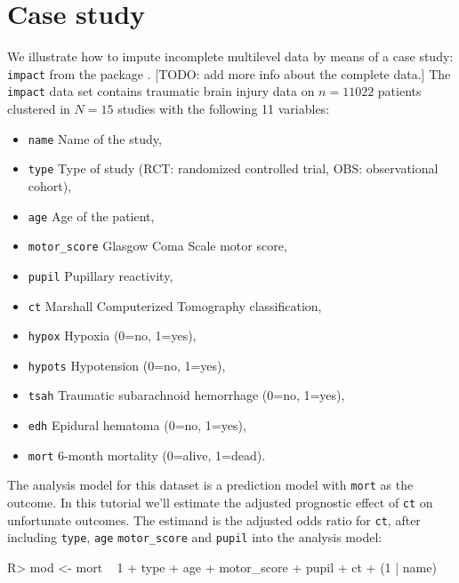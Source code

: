 \documentclass[
]{jss}
\providecommand{\tightlist}{%
  \setlength{\itemsep}{0pt}\setlength{\parskip}{0pt}}
\begin{document}
\hypertarget{case-study}{%
\section{Case study}\label{case-study}}

We illustrate how to impute incomplete multilevel data by means of a
case study: \texttt{impact} from the  package
\citep[empirical data on traumatic brain injuries, \(n = 11,022\) units
across \(N = 15\) clusters,][]{metamisc}. {[}TODO: add more info about
the complete data.{]} The \texttt{impact} data set contains traumatic
brain injury data on \(n = 11022\) patients clustered in \(N = 15\)
studies with the following 11 variables:

\begin{itemize}
\tightlist
\item
  \texttt{name} Name of the study,
\item
  \texttt{type} Type of study (RCT: randomized controlled trial, OBS:
  observational cohort),
\item
  \texttt{age} Age of the patient,
\item
  \texttt{motor\_score} Glasgow Coma Scale motor score,
\item
  \texttt{pupil} Pupillary reactivity,
\item
  \texttt{ct} Marshall Computerized Tomography classification,
\item
  \texttt{hypox} Hypoxia (0=no, 1=yes),
\item
  \texttt{hypots} Hypotension (0=no, 1=yes),
\item
  \texttt{tsah} Traumatic subarachnoid hemorrhage (0=no, 1=yes),
\item
  \texttt{edh} Epidural hematoma (0=no, 1=yes),
\item
  \texttt{mort} 6-month mortality (0=alive, 1=dead).
\end{itemize}

The analysis model for this dataset is a prediction model with
\texttt{mort} as the outcome. In this tutorial we'll estimate the
adjusted prognostic effect of \texttt{ct} on unfortunate outcomes. The
estimand is the adjusted odds ratio for \texttt{ct}, after including
\texttt{type}, \texttt{age} \texttt{motor\_score} and \texttt{pupil}
into the analysis model:

\begin{CodeChunk}
\begin{CodeInput}
R> mod <- mort ~ 1 + type + age + motor_score + pupil + ct + (1 | name)
\end{CodeInput}
\end{CodeChunk}
\end{document}
